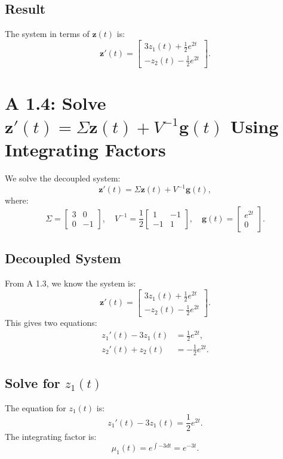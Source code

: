 \documentclass[12pt]{article}
\begin{document}
\subsection*{Result}
The system in terms of \(\mathbf{z}(t)\) is:
\[
\mathbf{z}'(t) = \begin{bmatrix} 3z_1(t) + \frac{1}{2}e^{2t} \\ -z_2(t) - \frac{1}{2}e^{2t} \end{bmatrix}.
\]

\section*{A 1.4: Solve \(\mathbf{z}'(t) = \Sigma\mathbf{z}(t) + V^{-1}\mathbf{g}(t)\) Using Integrating Factors}

We solve the decoupled system:
\[
\mathbf{z}'(t) = \Sigma\mathbf{z}(t) + V^{-1}\mathbf{g}(t),
\]
where:
\[
\Sigma = \begin{bmatrix} 3 & 0 \\ 0 & -1 \end{bmatrix}, \quad
V^{-1} = \frac{1}{2}\begin{bmatrix} 1 & -1 \\ -1 & 1 \end{bmatrix}, \quad
\mathbf{g}(t) = \begin{bmatrix} e^{2t} \\ 0 \end{bmatrix}.
\]

\subsection*{Decoupled System}
From A 1.3, we know the system is:
\[
\mathbf{z}'(t) = \begin{bmatrix} 3z_1(t) + \frac{1}{2}e^{2t} \\ -z_2(t) - \frac{1}{2}e^{2t} \end{bmatrix}.
\]
This gives two equations:
\begin{align*}
z_1'(t) - 3z_1(t) &= \frac{1}{2}e^{2t}, \\
z_2'(t) + z_2(t) &= -\frac{1}{2}e^{2t}.
\end{align*}

\subsection*{Solve for \(z_1(t)\)}
The equation for \(z_1(t)\) is:
\[
z_1'(t) - 3z_1(t) = \frac{1}{2}e^{2t}.
\]
The integrating factor is:
\[
\mu_1(t) = e^{\int -3dt} = e^{-3t}.
\]
\end{document}

